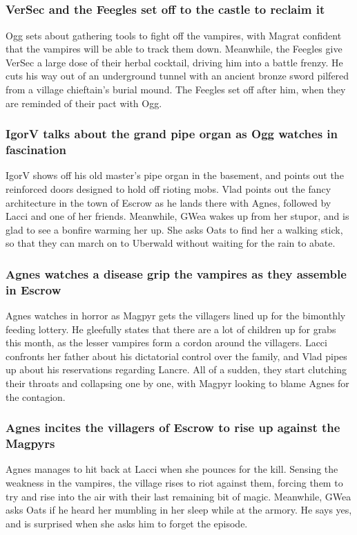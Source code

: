 \subsection{}
\subsubsection{\Gls{VerSec} and the Feegles set off to the castle to reclaim it}
\Gls{Ogg} sets about gathering tools to fight off the vampires, with \Gls{Magrat} confident that the
vampires will be able to track them down. Meanwhile, the Feegles give \Gls{VerSec} a large dose of
their herbal cocktail, driving him into a battle frenzy. He cuts his way out of an underground
tunnel with an ancient bronze sword pilfered from a village chieftain's burial mound. The Feegles
set off after him, when they are reminded of their pact with \Gls{Ogg}.

\subsubsection{\Gls{IgorV} talks about the grand pipe organ as \Gls{Ogg} watches in fascination}
\Gls{IgorV} shows off his old master's pipe organ in the basement, and points out the reinforced
doors designed to hold off rioting mobs. \Gls{Vlad} points out the fancy architecture in the town
of Escrow as he lands there with \Gls{Agnes}, followed by \Gls{Lacci} and one of her friends.
Meanwhile, \Gls{GWea} wakes up from her stupor, and is glad to see a bonfire warming her up. She
asks \Gls{Oats} to find her a walking stick, so that they can march on to Uberwald without waiting
for the rain to abate.

\subsubsection{\Gls{Agnes} watches a disease grip the vampires as they assemble in Escrow}
\Gls{Agnes} watches in horror as \Gls{Magpyr} gets the villagers lined up for the bimonthly
feeding lottery. He gleefully states that there are a lot of children up for grabs this month, as
the lesser vampires form a cordon around the villagers. \Gls{Lacci} confronts her father about
his dictatorial control over the family, and \Gls{Vlad} pipes up about his reservations regarding
Lancre. All of a sudden, they start clutching their throats and collapsing one by one, with
\Gls{Magpyr} looking to blame \Gls{Agnes} for the contagion.

\subsubsection{\Gls{Agnes} incites the villagers of Escrow to rise up against the Magpyrs}
\Gls{Agnes} manages to hit back at \Gls{Lacci} when she pounces for the kill. Sensing the weakness
in the vampires, the village rises to riot against them, forcing them to try and rise into the air
with their last remaining bit of magic. Meanwhile, \Gls{GWea} asks \Gls{Oats} if he heard her
mumbling in her sleep while at the armory. He says yes, and is surprised when she asks him to forget
the episode.

